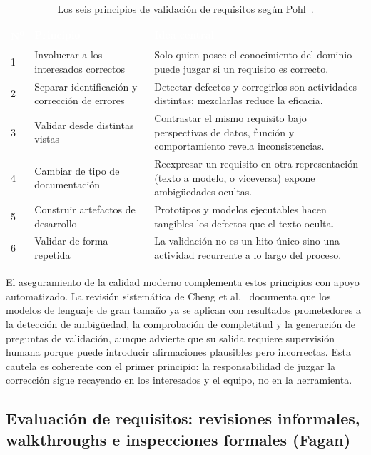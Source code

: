 \documentclass[11pt,a4paper,oneside]{report}
\newcommand{\hd}[1]{\cellcolor{darkblue}\textbf{\textcolor{white}{\small\sffamily #1}}}
\begin{document}
	\begin{table}[htbp]
		\centering
		\caption{Los seis principios de validaci\'on de requisitos seg\'un Pohl~\citep{pohl_2010}.}
		\label{tab:principios}
		\small\sffamily
		\begin{tabularx}{\linewidth}{@{}C{0.7cm} L{4.1cm} X@{}}
			\toprule
			\hd{N\textsuperscript{o}} & \hd{Principio} & \hd{Idea central}\\
			 & Involucrar a los interesados correctos & Solo quien posee el conocimiento del dominio puede juzgar si un requisito es correcto.\\
			2 & Separar identificaci\'on y correcci\'on de errores & Detectar defectos y corregirlos son actividades distintas; mezclarlas reduce la eficacia.\\
			3 & Validar desde distintas vistas & Contrastar el mismo requisito bajo perspectivas de datos, funci\'on y comportamiento revela inconsistencias.\\
			4 & Cambiar de tipo de documentaci\'on & Reexpresar un requisito en otra representaci\'on (texto a modelo, o viceversa) expone ambig\"uedades ocultas.\\
			5 & Construir artefactos de desarrollo & Prototipos y modelos ejecutables hacen tangibles los defectos que el texto oculta.\\
			6 & Validar de forma repetida & La validaci\'on no es un hito \'unico sino una actividad recurrente a lo largo del proceso.\\
			\bottomrule
		\end{tabularx}
	\end{table}
	
	El aseguramiento de la calidad moderno complementa estos principios con apoyo automatizado. La revisi\'on sistem\'atica de Cheng et al.~\citep{cheng_genai_re_2026} documenta que los modelos de lenguaje de gran tama\~no ya se aplican con resultados prometedores a la detecci\'on de ambig\"uedad, la comprobaci\'on de completitud y la generaci\'on de preguntas de validaci\'on, aunque advierte que su salida requiere supervisi\'on humana porque puede introducir afirmaciones plausibles pero incorrectas. Esta cautela es coherente con el primer principio: la responsabilidad de juzgar la correcci\'on sigue recayendo en los interesados y el equipo, no en la herramienta.
	
	\subsection{Evaluaci\'on de requisitos: revisiones informales, walkthroughs e inspecciones formales (Fagan)}
	
\end{document}
